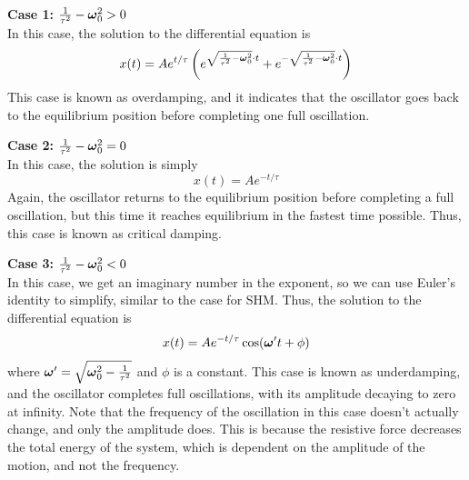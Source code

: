 \noindent \textbf{Case 1:} $\frac{1}{\tau^2} - \boldsymbol{\omega}_0^2 > 0$ \\
\noindent In this case, the solution to the differential equation is 
\begin{equation}
    x(t) = Ae^{t/\tau}\left( e^{\sqrt{\frac{1}{\tau^2} - \boldsymbol{\omega}_0^2}\cdot t} + e^{-\sqrt{\frac{1}{\tau^2} - \boldsymbol{\omega}_0^2}\cdot t} \right)
\end{equation}
\noindent This case is known as overdamping, and it indicates that the oscillator goes back to the equilibrium position before completing one full oscillation. 

\noindent \textbf{Case 2:} $\frac{1}{\tau^2} - \boldsymbol{\omega}_0^2 = 0$ \\
\noindent In this case, the solution is simply
\begin{equation}
    x(t) = Ae^{-t/\tau}
\end{equation}
\noindent Again, the oscillator returns to the equilibrium position before completing a full oscillation, but this time it reaches equilibrium in the fastest time possible. Thus, this case is known as critical damping.

\noindent \textbf{Case 3:} $\frac{1}{\tau^2} - \boldsymbol{\omega}_0^2 < 0$ \\
\noindent In this case, we get an imaginary number in the exponent, so we can use Euler's identity to simplify, similar to the case for SHM. Thus, the solution to the differential equation is 
\begin{equation}
    x(t) = Ae^{-t/\tau}\cos(\boldsymbol{\omega}' t + \phi)
\end{equation}
\noindent where $\boldsymbol{\omega}' = \sqrt{\boldsymbol{\omega}_0^2 - \frac{1}{\tau^2}}$ and $\phi$ is a constant. This case is known as underdamping, and the oscillator completes full oscillations, with its amplitude decaying to zero at infinity. Note that the frequency of the oscillation in this case doesn't actually change, and only the amplitude does. This is because the resistive force decreases the total energy of the system, which is dependent on the amplitude of the motion, and not the frequency.

%
%
